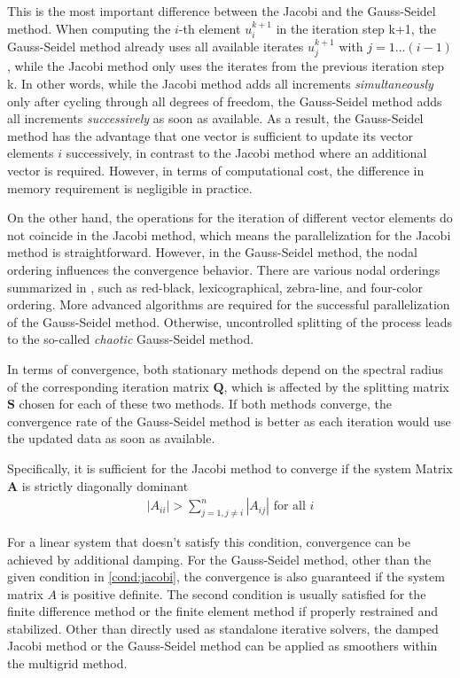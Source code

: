 This is the most important difference between the Jacobi and the Gauss-Seidel method. When computing the $i$-th element $u_i^{k+1}$ in the iteration step k+1, the Gauss-Seidel method already uses all available iterates $u_j^{k+1}$ with $j=1\dots(i-1)$, while the Jacobi method only uses the iterates from the previous iteration step k. In other words, while the Jacobi method adds all increments \textit{simultaneously} only after cycling through all degrees of freedom, the Gauss-Seidel method adds all increments \textit{successively} as soon as available. As a result, the Gauss-Seidel method has the advantage that one vector is sufficient to update its vector elements $i$ successively, in contrast to the Jacobi method where an additional vector is required. However, in terms of computational cost, the difference in memory requirement is negligible in practice. 

On the other hand, the operations for the iteration of different vector elements do not coincide in the Jacobi method, which means the parallelization for the Jacobi method is straightforward. However, in the Gauss-Seidel method, the nodal ordering influences the convergence behavior. There are various nodal orderings summarized in \cite{hackbusch2013multi}, such as red-black, lexicographical, zebra-line, and four-color ordering. More advanced algorithms are required for the successful parallelization of the Gauss-Seidel method. Otherwise, uncontrolled splitting of the process leads to the so-called \textit{chaotic} Gauss-Seidel method.  

In terms of convergence, both stationary methods depend on the spectral radius of the corresponding iteration matrix $\boldsymbol{Q}$, which is affected by the splitting matrix $\boldsymbol{S}$ chosen for each of these two methods. If both methods converge, the convergence rate of the Gauss-Seidel method is better as each iteration would use the updated data as soon as available. 

Specifically, it is sufficient for the Jacobi method to converge if the system Matrix $\boldsymbol{A}$ is strictly diagonally dominant 
\cite{https://doi.org/10.1002/zamm.19940740205}
\begin{align}
    |A_{ii}| > \sum_{j=1,j\neq i}^{n}|A_{ij}| \text{ for all }i
    \label{cond:jacobi}
\end{align}

For a linear system that doesn't satisfy this condition, convergence can be achieved by additional damping. For the Gauss-Seidel method, other than the given condition in \autoref{cond:jacobi}, the convergence is also guaranteed if the system matrix $A$ is positive definite. The second condition is usually satisfied for the finite difference method or the finite element method if properly restrained and stabilized. \cite{bathe2006finite} Other than directly used as standalone iterative solvers, the damped Jacobi method or the Gauss-Seidel method can be applied as smoothers within the multigrid method.

